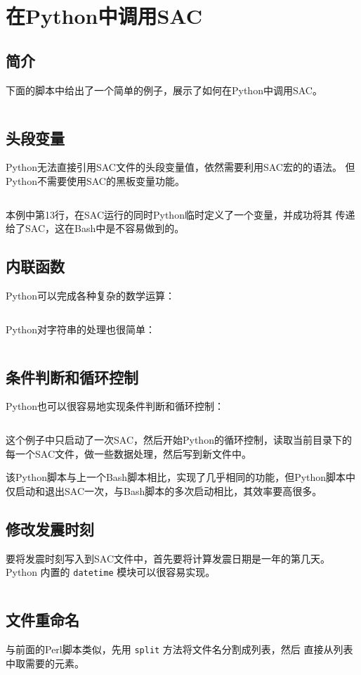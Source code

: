 \section{在Python中调用SAC}
\label{sec:sac-python}

\subsection{简介}
下面的脚本中给出了一个简单的例子，展示了如何在Python中调用SAC。
\inputminted{python}{./call-in-script/simple-script.py}

\subsection{头段变量}
Python无法直接引用SAC文件的头段变量值，依然需要利用SAC宏的的语法。
但Python不需要使用SAC的黑板变量功能。
\inputminted{python}{./call-in-script/variables.py}
本例中第13行，在SAC运行的同时Python临时定义了一个变量，并成功将其
传递给了SAC，这在Bash中是不容易做到的。

\subsection{内联函数}
Python可以完成各种复杂的数学运算：
\inputminted{python}{./call-in-script/arithmetic-functions.py}

Python对字符串的处理也很简单：
\inputminted{python}{./call-in-script/string-functions.py}

\subsection{条件判断和循环控制}
Python也可以很容易地实现条件判断和循环控制：
\inputminted{python}{./call-in-script/do-loops.py}
这个例子中只启动了一次SAC，然后开始Python的循环控制，读取当前目录下的
每一个SAC文件，做一些数据处理，然后写到新文件中。

该Python脚本与上一个Bash脚本相比，实现了几乎相同的功能，但Python脚本中
仅启动和退出SAC一次，与Bash脚本的多次启动相比，其效率要高很多。

\subsection{修改发震时刻}
要将发震时刻写入到SAC文件中，首先要将计算发震日期是一年的第几天。Python
内置的 \texttt{datetime} 模块可以很容易实现。
\inputminted{python}{./call-in-script/ch-origin.py}

\subsection{文件重命名}
\label{subsec:rename-in-python}
与前面的Perl脚本类似，先用 \texttt{split} 方法将文件名分割成列表，然后
直接从列表中取需要的元素。
\inputminted{python}{./call-in-script/rename.py}
